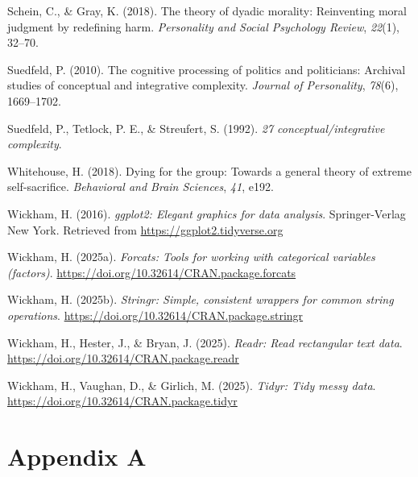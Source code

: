 \documentclass[
  english,
  man,floatsintext]{apa6}
\newlength{\cslhangindent}
\newenvironment{CSLReferences}[2] %
 {\begin{list}{}{%
  \setlength{\itemindent}{0pt}
  \setlength{\leftmargin}{0pt}
  \setlength{\parsep}{0pt}
  \ifodd #1
   \setlength{\leftmargin}{\cslhangindent}
   \setlength{\itemindent}{-1\cslhangindent}
  \fi
  \setlength{\itemsep}{#2\baselineskip}}}
 {\end{list}}
\begin{document}
\begin{CSLReferences}{1}{0}
Schein, C., \& Gray, K. (2018). The theory of dyadic morality: Reinventing moral judgment by redefining harm. \emph{Personality and Social Psychology Review}, \emph{22}(1), 32--70.

Suedfeld, P. (2010). The cognitive processing of politics and politicians: Archival studies of conceptual and integrative complexity. \emph{Journal of Personality}, \emph{78}(6), 1669--1702.

Suedfeld, P., Tetlock, P. E., \& Streufert, S. (1992). \emph{27 conceptual/integrative complexity}.

Whitehouse, H. (2018). Dying for the group: Towards a general theory of extreme self-sacrifice. \emph{Behavioral and Brain Sciences}, \emph{41}, e192.

Wickham, H. (2016). \emph{ggplot2: Elegant graphics for data analysis}. Springer-Verlag New York. Retrieved from \url{https://ggplot2.tidyverse.org}

Wickham, H. (2025a). \emph{Forcats: Tools for working with categorical variables (factors)}. \url{https://doi.org/10.32614/CRAN.package.forcats}

Wickham, H. (2025b). \emph{Stringr: Simple, consistent wrappers for common string operations}. \url{https://doi.org/10.32614/CRAN.package.stringr}

Wickham, H., Hester, J., \& Bryan, J. (2025). \emph{Readr: Read rectangular text data}. \url{https://doi.org/10.32614/CRAN.package.readr}

Wickham, H., Vaughan, D., \& Girlich, M. (2025). \emph{Tidyr: Tidy messy data}. \url{https://doi.org/10.32614/CRAN.package.tidyr}

\end{CSLReferences}

\newpage

\clearpage

\section{Appendix A}\label{appendix-a}
\end{document}
